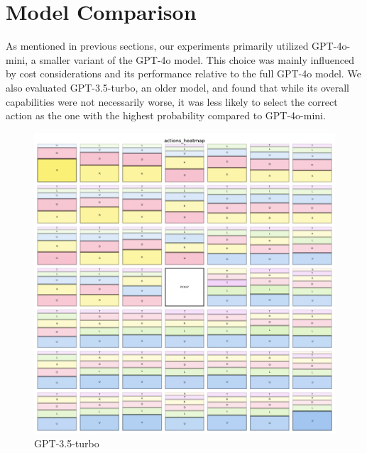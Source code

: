 \section{Model Comparison}
\label{sec:model_comparison}

As mentioned in previous sections, our experiments primarily utilized GPT-4o-mini,
a smaller variant of the GPT-4o model. This choice was mainly influenced by cost
considerations and its performance relative to the full GPT-4o model. We also evaluated
GPT-3.5-turbo, an older model, and found that while its overall capabilities were
not necessarily worse, it was less likely to select the correct action as the
one with the highest probability compared to GPT-4o-mini.

\begin{figure}[h]
  \centering
  \begin{minipage}[b]{0.32\textwidth}
    \centering
    \includegraphics[width=\textwidth]{
      images/results_discussion/models/GPT3.5-turbo/actions_heatmap.png
    }
    \caption{GPT-3.5-turbo}
    \label{fig:models_gpt35}
  \end{minipage}
  \hfill
  \begin{minipage}[b]{0.32\textwidth}
    \centering

\end{minipage}
\end{figure}
